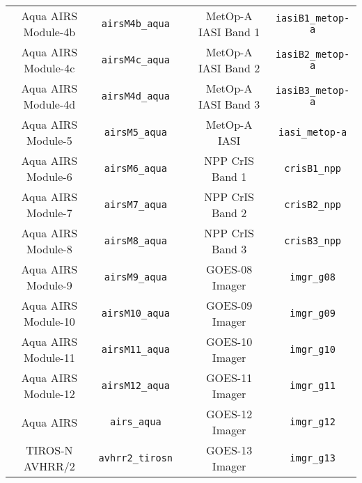 \begin{table}[htp]
\begin{tabular}{c c c c c}
Aqua AIRS Module-4b       & \texttt{airsM4b\_aqua}   & \hspace{0.2cm} & MetOp-A IASI Band 1          & \texttt{iasiB1\_metop-a}   \\
Aqua AIRS Module-4c       & \texttt{airsM4c\_aqua}   & \hspace{0.2cm} & MetOp-A IASI Band 2          & \texttt{iasiB2\_metop-a}   \\
Aqua AIRS Module-4d       & \texttt{airsM4d\_aqua}   & \hspace{0.2cm} & MetOp-A IASI Band 3          & \texttt{iasiB3\_metop-a}   \\
Aqua AIRS Module-5        & \texttt{airsM5\_aqua}    & \hspace{0.2cm} & MetOp-A IASI                 & \texttt{iasi\_metop-a}     \\
Aqua AIRS Module-6        & \texttt{airsM6\_aqua}    & \hspace{0.2cm} & NPP CrIS Band 1              & \texttt{crisB1\_npp}       \\
Aqua AIRS Module-7        & \texttt{airsM7\_aqua}    & \hspace{0.2cm} & NPP CrIS Band 2              & \texttt{crisB2\_npp}       \\
Aqua AIRS Module-8        & \texttt{airsM8\_aqua}    & \hspace{0.2cm} & NPP CrIS Band 3              & \texttt{crisB3\_npp}       \\
Aqua AIRS Module-9        & \texttt{airsM9\_aqua}    & \hspace{0.2cm} & GOES-08 Imager               & \texttt{imgr\_g08}         \\
Aqua AIRS Module-10       & \texttt{airsM10\_aqua}   & \hspace{0.2cm} & GOES-09 Imager               & \texttt{imgr\_g09}         \\
Aqua AIRS Module-11       & \texttt{airsM11\_aqua}   & \hspace{0.2cm} & GOES-10 Imager               & \texttt{imgr\_g10}         \\
Aqua AIRS Module-12       & \texttt{airsM12\_aqua}   & \hspace{0.2cm} & GOES-11 Imager               & \texttt{imgr\_g11}         \\
Aqua AIRS                 & \texttt{airs\_aqua}      & \hspace{0.2cm} & GOES-12 Imager               & \texttt{imgr\_g12}         \\
TIROS-N AVHRR/2           & \texttt{avhrr2\_tirosn}  & \hspace{0.2cm} & GOES-13 Imager               & \texttt{imgr\_g13}         \\

\end{tabular}
\end{table}
